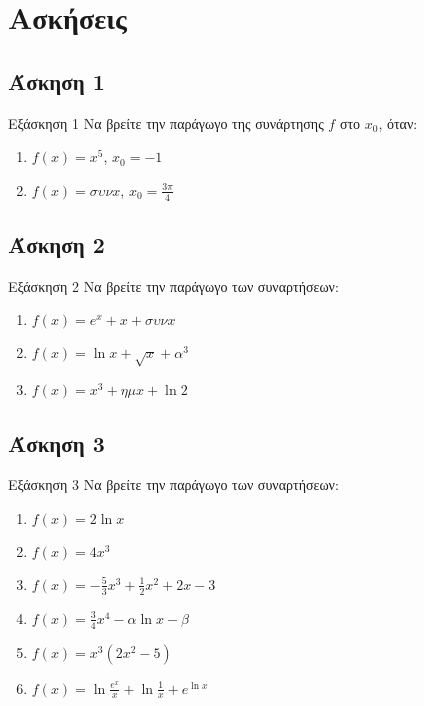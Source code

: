 \documentclass[greek]{beamer}
\begin{document}
\section{Ασκήσεις}
\subsection{Άσκηση 1}
\begin{frame}[label=Άσκηση1]{Εξάσκηση 1}
 Να βρείτε την παράγωγο της συνάρτησης $f$ στο $x_0$, όταν:
 \begin{enumerate}
  \item<1-> $f(x)=x^5$, $x_0=-1$
  \item<2-> $f(x)=συνx$, $x_0=\frac{3π}{4}$
 \end{enumerate}

\end{frame}

\subsection{Άσκηση 2}
\begin{frame}[label=Άσκηση2]{Εξάσκηση 2}
 Να βρείτε την παράγωγο των συναρτήσεων:
 \begin{enumerate}
  \item<1-> $f(x)=e^x+x+συνx$
  \item<2-> $f(x)=\ln x+\sqrt{x}+α^3$
  \item<3-> $f(x)=x^3+ημx+\ln 2$
 \end{enumerate}

\end{frame}

\subsection{Άσκηση 3}
\begin{frame}[label=Άσκηση3]{Εξάσκηση 3}
 Να βρείτε την παράγωγο των συναρτήσεων:
 \begin{enumerate}
  \item<1-> $f(x)=2\ln x$
  \item<2-> $f(x)=4x^3$
  \item<3-> $f(x)=-\frac{5}{3}x^3+\frac{1}{2}x^2+2x-3$
  \item<4-> $f(x)=\frac{3}{4}x^4-α\ln x-β$
  \item<5-> $f(x)=x^3(2x^2-5)$
  \item<6-> $f(x)=\ln \frac{e^x}{x}+\ln \frac{1}{x}+e^{\ln x}$
 \end{enumerate}

\end{frame}
\end{document}
